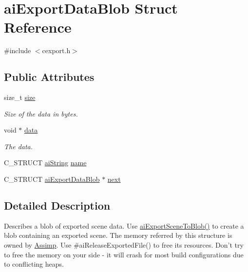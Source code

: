 \hypertarget{structai_export_data_blob}{\section{ai\-Export\-Data\-Blob Struct Reference}
\label{structai_export_data_blob}
}


{\ttfamily \#include $<$cexport.\-h$>$}

\subsection*{Public Attributes}
\begin{DoxyCompactItemize}
\item 
\hypertarget{structai_export_data_blob_a339bfaacc70396b2f99f94c1bc3b808f}{size\-\_\-t \hyperlink{structai_export_data_blob_a339bfaacc70396b2f99f94c1bc3b808f}{size}}\label{structai_export_data_blob_a339bfaacc70396b2f99f94c1bc3b808f}

\begin{DoxyCompactList}\small\item\em Size of the data in bytes. \end{DoxyCompactList}\item 
\hypertarget{structai_export_data_blob_ac080c780dad92077b42447d77a1a9ed1}{void $\ast$ \hyperlink{structai_export_data_blob_ac080c780dad92077b42447d77a1a9ed1}{data}}\label{structai_export_data_blob_ac080c780dad92077b42447d77a1a9ed1}

\begin{DoxyCompactList}\small\item\em The data. \end{DoxyCompactList}\item 
C\-\_\-\-S\-T\-R\-U\-C\-T \hyperlink{structai_string}{ai\-String} \hyperlink{structai_export_data_blob_af7f006ac5ad818c0d81d520a84f74c3e}{name}
\item 
C\-\_\-\-S\-T\-R\-U\-C\-T \hyperlink{structai_export_data_blob}{ai\-Export\-Data\-Blob} $\ast$ \hyperlink{structai_export_data_blob_a3e98fa760f45983ff1bccec6715f3817}{next}
\end{DoxyCompactItemize}


\subsection{Detailed Description}
Describes a blob of exported scene data. Use \hyperlink{cexport_8h_a33b02f2dbfd79980bf29e62f3a64139f}{ai\-Export\-Scene\-To\-Blob()} to create a blob containing an exported scene. The memory referred by this structure is owned by \hyperlink{namespace_assimp}{Assimp}. Use \#ai\-Release\-Exported\-File() to free its resources. Don't try to free the memory on your side -\/ it will crash for most build configurations due to conflicting heaps.

